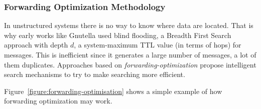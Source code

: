\subsubsection{Forwarding Optimization Methodology}
In unstructured systems there is no way to know where data are located. That is
why early works like Gnutella \cite{gnutellav04} used blind flooding, a Breadth
First Search approach with depth $d$, a system-maximum TTL value (in terms of
hops) for messages. This is inefficient since it generates a large number of
messages, a lot of them duplicates. Approaches based on
\emph{forwarding-optimization} propose intelligent search mechanisms to try to
make searching more efficient.

Figure~\ref{figure:forwarding-optimisation} shows a simple example
of how forwarding optimization may work.
